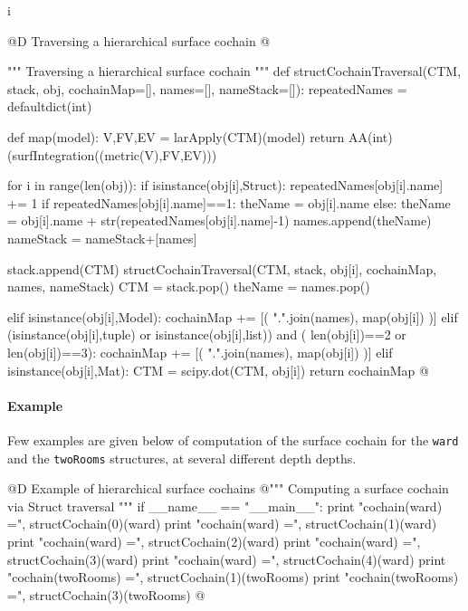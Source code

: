 i\documentclass[11pt,oneside]{article}    %
\begin{document}
@D Traversing a hierarchical surface cochain
@{""" Traversing a hierarchical surface cochain """
def structCochainTraversal(CTM, stack, obj, cochainMap=[], names=[], nameStack=[]):
    repeatedNames = defaultdict(int)
    
    def map(model):
        V,FV,EV = larApply(CTM)(model)
        return AA(int)(surfIntegration((metric(V),FV,EV)))
    
    for i in range(len(obj)):
        if isinstance(obj[i],Struct):
            repeatedNames[obj[i].name] += 1
            if repeatedNames[obj[i].name]==1: theName = obj[i].name
            else: theName = obj[i].name + str(repeatedNames[obj[i].name]-1)
            names.append(theName)
            nameStack = nameStack+[names]
            
            stack.append(CTM) 
            structCochainTraversal(CTM, stack, obj[i], cochainMap, names, nameStack)
            CTM = stack.pop()
            theName = names.pop()
            
        elif isinstance(obj[i],Model): 
            cochainMap += [( ".".join(names), map(obj[i]) )]
        elif (isinstance(obj[i],tuple) or isinstance(obj[i],list)) and (
              len(obj[i])==2 or len(obj[i])==3):
            cochainMap += [( ".".join(names), map(obj[i]) )]
        elif isinstance(obj[i],Mat): 
            CTM = scipy.dot(CTM, obj[i])
    return cochainMap
@}

\paragraph{Example}

Few examples are given below of computation of the surface cochain for the \texttt{ward} and the \texttt{twoRooms} structures, at several different depth depths.

@D Example of hierarchical surface cochains
@{""" Computing a surface cochain via Struct traversal """
if __name__ == "__main__":
    print "\nsurface cochain(ward) =", structCochain(0)(ward)
    print "\nsurface cochain(ward) =", structCochain(1)(ward)
    print "\nsurface cochain(ward) =", structCochain(2)(ward)
    print "\nsurface cochain(ward) =", structCochain(3)(ward)
    print "\nsurface cochain(ward) =", structCochain(4)(ward)
    print "\nsurface cochain(twoRooms) =", structCochain(1)(twoRooms)
    print "\nsurface cochain(twoRooms) =", structCochain(3)(twoRooms)
@}
\end{document}
